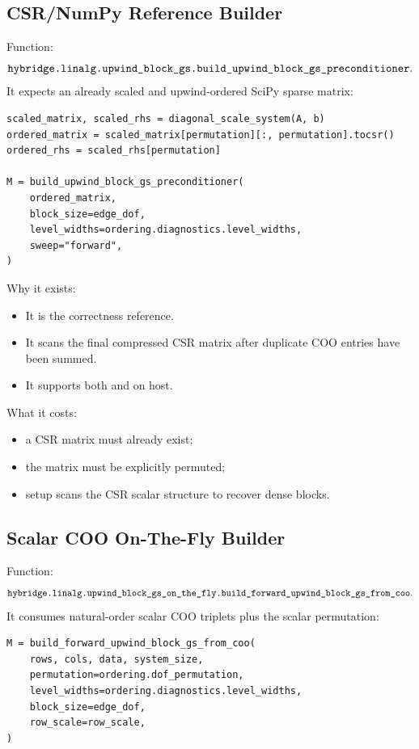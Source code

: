 \documentclass[11pt]{article}
\newcommand{\code}[1]{\texttt{\detokenize{#1}}}
\begin{document}
\subsection{CSR/NumPy Reference Builder}

Function:
\[
  \code{hybridge.linalg.upwind_block_gs.build_upwind_block_gs_preconditioner}.
\]
It expects an already scaled and upwind-ordered SciPy sparse matrix:
\begin{lstlisting}
scaled_matrix, scaled_rhs = diagonal_scale_system(A, b)
ordered_matrix = scaled_matrix[permutation][:, permutation].tocsr()
ordered_rhs = scaled_rhs[permutation]

M = build_upwind_block_gs_preconditioner(
    ordered_matrix,
    block_size=edge_dof,
    level_widths=ordering.diagnostics.level_widths,
    sweep="forward",
)
\end{lstlisting}

Why it exists:
\begin{itemize}[nosep]
  \item It is the correctness reference.
  \item It scans the final compressed CSR matrix after duplicate COO entries
        have been summed.
  \item It supports both \code{forward} and \code{forward_backward} on host.
\end{itemize}

What it costs:
\begin{itemize}[nosep]
  \item a CSR matrix must already exist;
  \item the matrix must be explicitly permuted;
  \item setup scans the CSR scalar structure to recover dense blocks.
\end{itemize}

\subsection{Scalar COO On-The-Fly Builder}

Function:
\[
  \code{hybridge.linalg.upwind_block_gs_on_the_fly.build_forward_upwind_block_gs_from_coo}.
\]
It consumes natural-order scalar COO triplets plus the scalar permutation:
\begin{lstlisting}
M = build_forward_upwind_block_gs_from_coo(
    rows, cols, data, system_size,
    permutation=ordering.dof_permutation,
    level_widths=ordering.diagnostics.level_widths,
    block_size=edge_dof,
    row_scale=row_scale,
)
\end{lstlisting}
\end{document}
